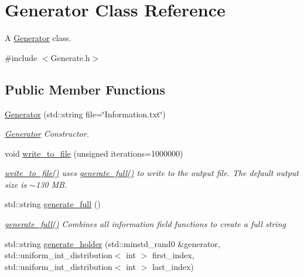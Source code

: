 \hypertarget{class_generator}{}\section{Generator Class Reference}
\label{class_generator}


A \hyperlink{class_generator}{Generator} class.  




{\ttfamily \#include $<$Generate.\+h$>$}

\subsection*{Public Member Functions}
\begin{DoxyCompactItemize}
\item 
\hyperlink{class_generator_ae2d35b67b9814dd4600c10be5e397811}{Generator} (std\+::string file=\char`\"{}Information.\+txt\char`\"{})
\begin{DoxyCompactList}\small\item\em \hyperlink{class_generator}{Generator} Constructor. \end{DoxyCompactList}\item 
void \hyperlink{class_generator_a097fbf1a97fb6dd2f8c1f7f4423dcb79}{write\+\_\+to\+\_\+file} (unsigned iterations=1000000)
\begin{DoxyCompactList}\small\item\em \hyperlink{class_generator_a097fbf1a97fb6dd2f8c1f7f4423dcb79}{write\+\_\+to\+\_\+file()} uses \hyperlink{class_generator_a5fd55ab53733cc8ef626fc1d820bd5bd}{generate\+\_\+full()} to write to the output file. The default output size is $\sim$130 MB. \end{DoxyCompactList}\item 
std\+::string \hyperlink{class_generator_a5fd55ab53733cc8ef626fc1d820bd5bd}{generate\+\_\+full} ()
\begin{DoxyCompactList}\small\item\em \hyperlink{class_generator_a5fd55ab53733cc8ef626fc1d820bd5bd}{generate\+\_\+full()} Combines all information field functions to create a full string \end{DoxyCompactList}\item 
std\+::string \hyperlink{class_generator_a9ad03b3204c0809c70c0c496c84a4cb0}{generate\+\_\+holder} (std\+::minstd\+\_\+rand0 \&generator, std\+::uniform\+\_\+int\+\_\+distribution$<$ int $>$ first\+\_\+index, std\+::uniform\+\_\+int\+\_\+distribution$<$ int $>$ last\+\_\+index)

\end{DoxyCompactItemize}
